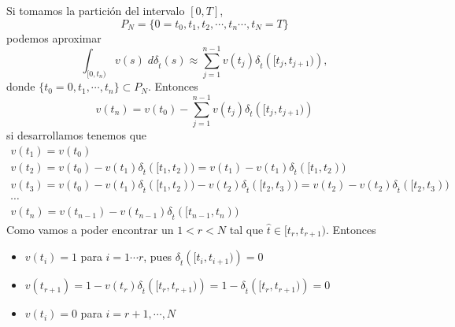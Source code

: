 \begin{example}
\begin{multicols}{2}
\end{multicols}
%
%
%				 
%
%
%


Si tomamos la partición del intervalo $[0,T]$, 
$$P_N=\{0=t_0,t_1, t_2,\cdots,t_n\cdots, t_N=T\}$$
podemos aproximar $$\displaystyle\int_{[0,t_n)}v(s) \; d\delta_{\hat{t}}(s) \approx \sum_{j=1}^{n-1}v(t_j)\delta_{\hat{t}}\left( [t_j,t_{j+1})\right), $$ donde $\{t_0=0,t_1,\cdots , t_n\}\subset P_N$. Entonces 
	\begin{equation*}
		v(t_n)=v(t_0)-\sum_{j=1}^{n-1}v(t_j)\delta_{\hat{t}}\left( [t_j,t_{j+1})\right) 
	\end{equation*}
si desarrollamos tenemos que
$$\begin{array}{l}
	v(t_1)=v(t_0)\\
	v(t_2)=v(t_0)-v(t_1)\delta_{\hat{t}}([t_1,t_2))=v(t_1)-v(t_1)\delta_{\hat{t}}([t_1,t_2))\\
	v(t_3)=v(t_0)-v(t_1)\delta_{\hat{t}}([t_1,t_2))-v(t_2)\delta_{\hat{t}}([t_2,t_3))=v(t_2)-v(t_2)\delta_{\hat{t}}([t_2,t_3))\\
	\cdots\\
	v(t_n)=v(t_{n-1})-v(t_{n-1})\delta_{\hat{t}}([t_{n-1},t_n))
\end{array}$$
Como vamos a poder encontrar un $1<r<N$ tal que $\hat{t}\in [t_r,t_{r+1})$. Entonces
\begin{itemize}
	\item  $v(t_i)=1$ para $i=1\cdots r$, pues $\delta_{\hat{t}}\left( [t_i,t_{i+1})\right)=0$
	\item$v(t_{r+1})=1-v(t_{r})\delta_{\hat{t}}\left( [t_{r},t_{r+1})\right)=1-\delta_{\hat{t}}\left( [t_{r},t_{r+1})\right)=0$
	\item $v(t_i)=0$ para $i=r+1, \cdots ,N$
\end{itemize}



\end{example}
